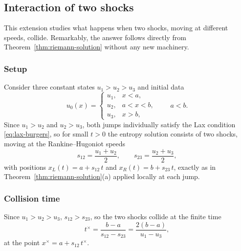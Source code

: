 \subsection{Interaction of two shocks}
\label{subsec:shock-interaction}

This extension studies what happens when two shocks, moving at different
speeds, collide. Remarkably, the answer follows directly from
Theorem~\ref{thm:riemann-solution} without any new machinery.

\subsubsection{Setup}
\label{subsubsec:interaction-setup}

Consider three constant states $u_1 > u_2 > u_3$ and initial data
\begin{equation}
  \label{eq:three-state-data}
  u_0(x) = \begin{cases} u_1, & x<a, \\ u_2, & a<x<b, \\ u_3, & x>b, \end{cases}
  \qquad a<b.
\end{equation}
Since $u_1>u_2$ and $u_2>u_3$, both jumps individually satisfy the Lax
condition \eqref{eq:lax-burgers}, so for small $t>0$ the entropy solution
consists of two shocks, moving at the Rankine--Hugoniot speeds
\begin{equation}
  \label{eq:two-shock-speeds}
  s_{12} = \frac{u_1+u_2}{2}, \qquad s_{23} = \frac{u_2+u_3}{2},
\end{equation}
with positions $x_L(t) = a+s_{12}\,t$ and $x_R(t) = b+s_{23}\,t$, exactly
as in Theorem~\ref{thm:riemann-solution}(a) applied locally at each jump.

\subsubsection{Collision time}
\label{subsubsec:collision-time}

\begin{proposition}
\label{prop:shock-collision}
Since $u_1>u_2>u_3$, $s_{12}>s_{23}$, so the two shocks collide at the
finite time
\begin{equation}
  \label{eq:collision-time}
  t^{\times} = \frac{b-a}{s_{12}-s_{23}} = \frac{2(b-a)}{u_1-u_3},
\end{equation}
at the point $x^{\times} = a + s_{12}\, t^{\times}$.
\end{proposition}

